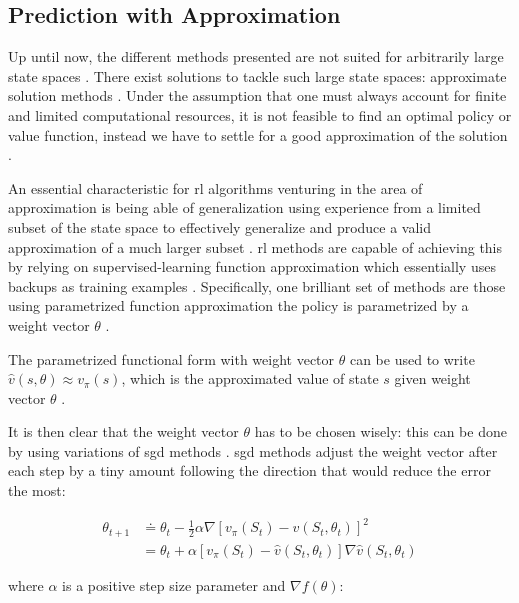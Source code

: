 \documentclass[draft=false]{seal_thesis}
\begin{document}
\subsection{ Prediction with Approximation}
\label{subsec:onpol_pred}

Up until now, the different methods presented are not suited for arbitrarily large state spaces \citep{Sutton2017}. There exist solutions to tackle such large state spaces: approximate solution methods \citep{Sutton2017}. Under the assumption that one must always account for finite and limited computational resources, it is not feasible to find an optimal policy or value function, instead we have to settle for a good approximation of the solution \citep[p. 189]{Sutton2017}.

An essential characteristic for \gls{rl} algorithms venturing in the area of approximation is being able of generalization \ie using experience from a limited subset of the state space to effectively generalize and produce a valid approximation of a much larger subset  \citep[p. 189]{Sutton2017}. \gls{rl} methods are capable of achieving this by relying on supervised-learning function approximation which essentially uses backups as training examples \citep[p. 222]{Sutton2017}. Specifically, one brilliant set of methods are those using parametrized function approximation \ie the policy is parametrized by a weight vector $\theta$ \citep{Sutton2017}.

The parametrized functional form with weight vector $\theta$ can be used to write $\hat{v}(s,\theta) \approx v_\pi (s)$, which is the approximated value of state $s$ given weight vector $\theta$ \citep[p. 191]{Sutton2017}.

It is then clear that the weight vector $\theta$ has to be chosen wisely: this can be done by using variations of \gls{sgd} methods \citep[p. 223]{Sutton2017}. \gls{sgd} methods adjust the weight vector after each step by a tiny amount following the direction that would reduce the error the most:

\begin{align}
	\theta_{t+1} &\doteq \theta_t - \frac{1}{2} \alpha \nabla [v_\pi (S_t) - \hat{v} (S_t,\theta_t)]^2\\
	&= \theta_t + \alpha  [v_\pi (S_t) - \hat{v} (S_t,\theta_t)] \nabla \hat{v} (S_t,\theta_t)
\end{align}

where $\alpha$ is a positive step size parameter and $\nabla f(\theta)$:
\end{document}
